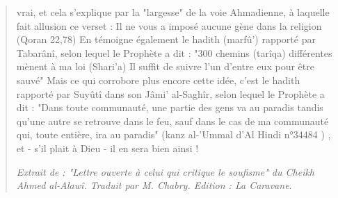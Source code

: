 \begin{quote}
vrai, et cela s'explique par la "largesse" de la voie Ahmadienne, à
laquelle fait allusion ce verset : Il ne vous a imposé aucune gène dans
la religion (Qoran 22,78) En témoigne également le hadith (marfû')
rapporté par Tabarânî, selon lequel le Prophète a dit : "300 chemins
(tarîqa) différentes mènent à ma loi (Shari'a) Il suffit de suivre l'un
d'entre eux pour être sauvé" Mais ce qui corrobore plus encore cette
idée, c'est le hadith rapporté par Suyûtî dans son Jâmi' al-Saghîr,
selon lequel le Prophète a dit : "Dans toute communauté, une partie des
gens va au paradis tandis qu'une autre se retrouve dans le feu, sauf
dans le cas de ma communauté qui, toute entière, ira au paradis" (kanz
al-'Ummal d'Al Hindi n°34484 ) , et - s'il plait à Dieu - il en sera
bien ainsi !

\emph{Extrait de : "Lettre ouverte à celui qui critique le soufisme" du
Cheikh Ahmed al-Alawî. Traduit par M. Chabry. Edition : La Caravane}.
\end{quote}
